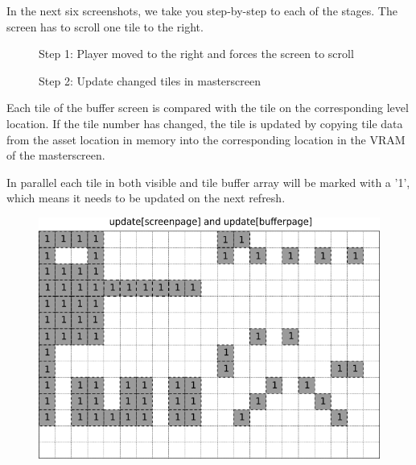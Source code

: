 \documentclass[book.tex]{subfiles}
\begin{document}
In the next six screenshots, we take you step-by-step to each of the stages. The screen has to scroll one tile to the right. \\

\begin{figure}[H]
\centering
 \caption{Step 1: Player moved to the right and forces the screen to scroll}
 \label{fig:kc1_3_start}
\end{figure}

\begin{figure}[H]
\centering
 \caption{Step 2: Update changed tiles in masterscreen}
 \label{fig:kc1_3_update_masterscreen}
\end{figure}


\begin{minipage}{.4\textwidth}
Each tile of the buffer screen is compared with the tile on the corresponding level location. If the tile number has changed, the tile is updated by copying tile data from the asset location in memory into the corresponding location in the VRAM of the masterscreen.\\
\par
In parallel each tile in both visible and tile buffer array will be marked with a '1', which means it needs to be updated on the next refresh.
 \end{minipage}
\begin{minipage}{.6\textwidth}
\begin{figure}[H]
  \centering
 \includegraphics[width=.9\textwidth]{screenshots_300dpi/game/Scroll_KC1-3_1-scroll_update.png}
 \label{fig:kc1_3_update_refresh_img_1}  
\end{figure}
\end{minipage}
\end{document}
